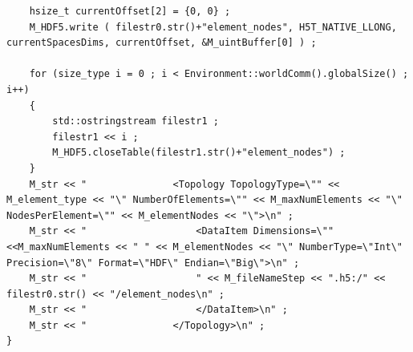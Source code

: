 \documentclass[12pt]{article}
\begin{document}
\begin{lstlisting}
    hsize_t currentOffset[2] = {0, 0} ;
    M_HDF5.write ( filestr0.str()+"element_nodes", H5T_NATIVE_LLONG, currentSpacesDims, currentOffset, &M_uintBuffer[0] ) ;

    for (size_type i = 0 ; i < Environment::worldComm().globalSize() ; i++)
    {
        std::ostringstream filestr1 ;
        filestr1 << i ;
        M_HDF5.closeTable(filestr1.str()+"element_nodes") ;
    }
    M_str << "               <Topology TopologyType=\"" << M_element_type << "\" NumberOfElements=\"" << M_maxNumElements << "\" NodesPerElement=\"" << M_elementNodes << "\">\n" ;
    M_str << "                   <DataItem Dimensions=\"" <<M_maxNumElements << " " << M_elementNodes << "\" NumberType=\"Int\" Precision=\"8\" Format=\"HDF\" Endian=\"Big\">\n" ;
    M_str << "                   " << M_fileNameStep << ".h5:/" << filestr0.str() << "/element_nodes\n" ;
    M_str << "                   </DataItem>\n" ;
    M_str << "               </Topology>\n" ;
}
\end{lstlisting}
\newpage
\end{document}
